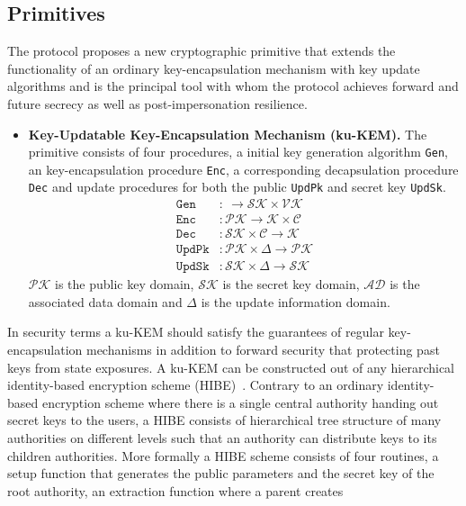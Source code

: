 \documentclass[11pt,a4paper,twoside,openright,bibliography=totoc]{scrbook}
\begin{document}
\subsection{Primitives}
\label{sec:primitives}

The protocol proposes a new cryptographic primitive that extends the
functionality of an ordinary key-encapsulation mechanism with
key update algorithms and is the principal tool with whom the
protocol achieves forward and future secrecy as well as
post-impersonation resilience.
\begin{itemize}
\item \textbf{Key-Updatable Key-Encapsulation Mechanism (ku-KEM).} The primitive
  consists of four procedures, a initial key generation algorithm \texttt{Gen}, an
  key-encapsulation procedure \texttt{Enc}, a corresponding decapsulation
  procedure \texttt{Dec} and
  update procedures for both the public \texttt{UpdPk} and secret key \texttt{UpdSk}.
  \begin{align*}
    \texttt{Gen} & : \ \rightarrow \mathcal{SK} \times \mathcal{VK} \\
    \texttt{Enc} & : \mathcal{PK} \rightarrow \mathcal{K} \times \mathcal{C} \\ 
    \texttt{Dec} & : \mathcal{SK} \times \mathcal{C} \rightarrow \mathcal{K} \\
    \texttt{UpdPk} & : \mathcal{PK} \times \Delta \rightarrow \mathcal{PK} \\
    \texttt{UpdSk} & : \mathcal{SK} \times \Delta \rightarrow \mathcal{SK}
  \end{align*}
  $\mathcal{PK}$ is the public key domain, $\mathcal{SK}$ is the secret key domain,
  $\mathcal{AD}$ is the associated data domain and $\Delta$ is
  the update information domain.
\end{itemize}
In security terms a ku-KEM should satisfy the guarantees of regular
key-encapsulation mechanisms in addition to forward security that
protecting past keys from state exposures. A ku-KEM can be constructed
out of any hierarchical identity-based encryption scheme
(HIBE)~\cite{gentry2002hierarchical}. Contrary to an ordinary
identity-based encryption scheme where there is a single central
authority handing out secret keys to the users, a HIBE consists
of hierarchical tree structure of many authorities on different levels
such that an authority can distribute keys to its children authorities.
More formally a HIBE scheme consists of four routines, a setup
function that generates the public parameters and the secret key
of the root authority, an extraction function where a parent creates
\end{document}

